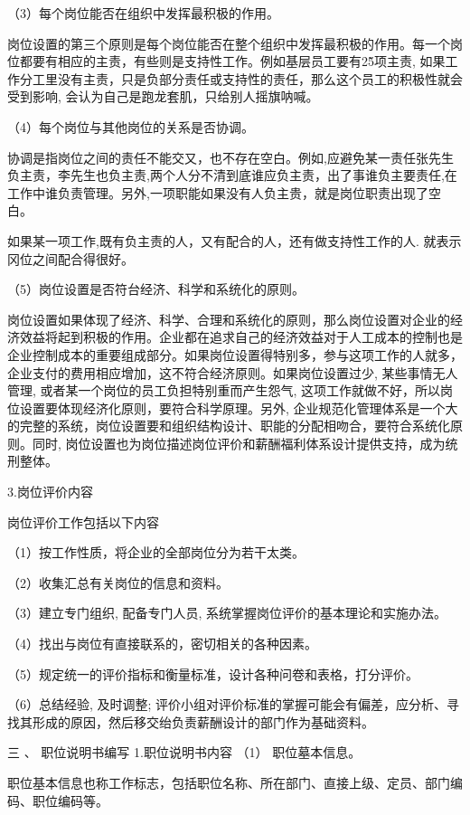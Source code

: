 \documentclass[CJK]{z-article}
\begin{document}
    （3）每个岗位能否在组织中发挥最积极的作用。

    岗位设置的第三个原则是每个岗位能否在整个组织中发挥最积极的作用。每一个岗位都要有相应的主责，有些则是支持性工作。例如基层员工要有2\~5项主责, 如果工作分工里没有主责，只是负部分责任或支持性的责任，那么这个员工的积极性就会受到影响, 会认为自己是跑龙套肌，只给别人摇旗呐喊。

    （4）每个岗位与其他岗位的关系是否协调。

    协调是指岗位之间的责任不能交又，也不存在空白。例如,应避免某一责任张先生负主责，李先生也负主责,两个人分不清到底谁应负主责，出了事谁负主要责任,在工作中谁负责管理。另外,一项职能如果没有人负主贵，就是岗位职责出现了空白。

    如果某一项工作,既有负主责的人，又有配合的人，还有做支持性工作的人. 就表示冈位之间配合得很好。

    （5）岗位设置是否符台经济、科学和系统化的原则。

    岗位设置如果体现了经济、科学、合理和系统化的原则，那么岗位设置对企业的经济效益将起到积极的作用。企业都在追求自己的经济效益对于人工成本的控制也是企业控制成本的重要组成部分。如果岗位设置得特别多，参与这项工作的人就多，企业支付的费用相应增加，这不符合经济原则。如果岗位设置过少, 某些事情无人管理, 或者某一个岗位的员工负担特别重而产生怨气, 这项工作就做不好，所以岗位设置要体现经济化原则，要符合科学原理。另外, 企业规范化管理体系是一个大的完整的系统，岗位设置要和组织结构设计、职能的分配相吻合，要符合系统化原则。同时, 岗位设置也为岗位描述岗位评价和薪酬福利体系设计提供支持，成为统刑整体。

    3.岗位评价内容

    岗位评价工作包括以下内容

    （1）按工作性质，将企业的全部岗位分为若干太类。

    （2）收集汇总有关岗位的信息和资料。

    （3）建立专门组织, 配备专门人员, 系统掌握岗位评价的基本理论和实施办法。

    （4）找出与岗位有直接联系的，密切相关的各种因素。

    （5）规定统一的评价指标和衡量标准，设计各种问卷和表格，打分评价。

    （6）总结经验, 及时调整; 评价小组对评价标准的掌握可能会有偏差，应分析、寻找其形成的原因，然后移交绐负责薪酬设计的部门作为基础资料。

    三 、 职位说明书编写
    1.职位说明书内容
    （1） 职位墓本信息。

    职位基本信息也称工作标志，包括职位名称、所在部门、直接上级、定员、部门编码、职位编码等。
\end{document}
